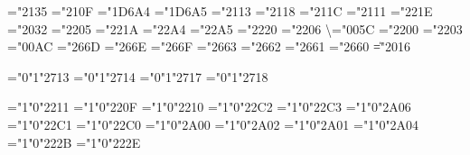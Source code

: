 \Umathcharnumdef\aleph="2135      %
\Umathcharnumdef\hbar="210F       %
\Umathcharnumdef\imath="1D6A4     %
\Umathcharnumdef\jmath="1D6A5     %
\Umathcharnumdef\ell="2113        %
\Umathcharnumdef\wp="2118         %
\Umathcharnumdef\Re="211C         %
\Umathcharnumdef\Im="2111         %
\Umathcharnumdef\infty="221E      %
\Umathcharnumdef\prime="2032      %
\Umathcharnumdef\emptyset="2205   %
\Umathcharnumdef\surd="221A       %
\Umathcharnumdef\top="22A4        %
\Umathcharnumdef\bot="22A5        %
\Umathcharnumdef\angle="2220      %
\Umathcharnumdef\triangle="2206   %
\Umathcharnumdef\backslash="005C  %
\Umathcharnumdef\forall="2200     %
\Umathcharnumdef\exists="2203     %
\Umathcharnumdef\neg="00AC        %
\Umathcharnumdef\flat="266D       %
\Umathcharnumdef\natural="266E    %
\Umathcharnumdef\sharp="266F      %
\Umathcharnumdef\clubsuit="2663   %
\Umathcharnumdef\diamondsuit="2662 %
\Umathcharnumdef\heartsuit="2661  %
\Umathcharnumdef\spadesuit="2660  %
\Umathcharnumdef\|="2016          %

\Umathchardef{}="0"1"2713       %
\Umathchardef{}="0"1"2714       %
\Umathchardef{}="0"1"2717       %
\Umathchardef{}="0"1"2718       %


\Umathchardef\sum="1"0"2211       %
\Umathchardef\prod="1"0"220F      %
\Umathchardef\coprod="1"0"2210    %
\Umathchardef\bigcap="1"0"22C2    %
\Umathchardef\bigcup="1"0"22C3    %
\Umathchardef\bigsqcup="1"0"2A06  %
\Umathchardef\bigvee="1"0"22C1    %
\Umathchardef\bigwedge="1"0"22C0  %
\Umathchardef\bigodot="1"0"2A00   %
\Umathchardef\bigotimes="1"0"2A02 %
\Umathchardef\bigoplus="1"0"2A01  %
\Umathchardef\biguplus="1"0"2A04  %
\Umathchardef\intop="1"0"222B     %
\Umathchardef\ointop="1"0"222E    %

